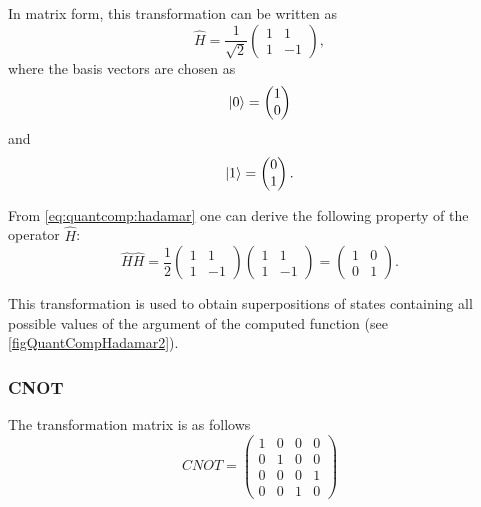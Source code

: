 In matrix form, this transformation can be written as
\begin{equation}
\hat{H} = \frac{1}{\sqrt{2}}
\begin{pmatrix}
1 & 1 \\
1 & -1
\end{pmatrix},
\label{eq:quantcomp:hadamar}
\end{equation}
where the basis vectors are chosen as
\[
\ket{0} = \begin{pmatrix}
1 \\ 0 
\end{pmatrix}
\]
and
\[
\ket{1} = \begin{pmatrix}
0 \\ 1 
\end{pmatrix}.
\]



From \eqref{eq:quantcomp:hadamar} one can derive the following property of the operator $\hat{H}$:
\begin{equation}
\hat{H} \hat{H} = \frac{1}{2}
\begin{pmatrix}
1 & 1 \\
1 & -1
\end{pmatrix}
\begin{pmatrix}
1 & 1 \\
1 & -1
\end{pmatrix} = 
\begin{pmatrix}
1 & 0 \\
0 & 1
\end{pmatrix}.
\label{eq:quantcomp:hadamar_prop}
\end{equation}

This transformation is used to obtain superpositions of states containing all possible values of the argument of the computed function (see \autoref{figQuantCompHadamar2}). 



\subsubsection{CNOT}

The transformation matrix is as follows
\[
CNOT=\begin{pmatrix}
1 & 0 & 0 & 0 \\
0 & 1 & 0 & 0 \\
0 & 0 & 0 & 1 \\
0 & 0 & 1 & 0 
\end{pmatrix}
\]

